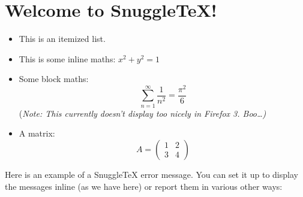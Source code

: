 \section*{Welcome to SnuggleTeX!}

\begin{itemize}
  \item This is an itemized list.

  \item This is some inline maths: $x^2+ y^2 = 1$

  \item Some block maths:
        \[ \sum_{n=1}^\infty \frac{1}{n^2} = \frac{\pi^2}{6} \]
        (\em{Note}: This currently doesn't display too nicely in Firefox 3. Boo\ldots)

  \item A matrix:
        \[ A = \left( \begin{array}{cc} 1 & 2 \\ 3 & 4 \end{array} \right) \]

\end{itemize}

Here is an example of a SnuggleTeX error message. You can set it up to display the messages inline (as we have here) or report them in various other ways:

\doh
